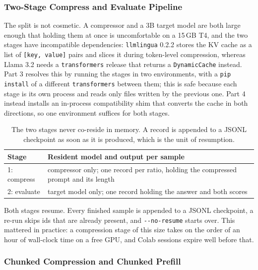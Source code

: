 ﻿\documentclass[10pt,a4paper,twocolumn]{article}
\begin{document}
\subsubsection{Two-Stage Compress and Evaluate Pipeline}
\label{sec:pipeline}

The split is not cosmetic. A compressor and a 3B target model are both large
enough that holding them at once is uncomfortable on a 15\,GB T4, and the two
stages have incompatible dependencies: \texttt{llmlingua} 0.2.2 stores the KV
cache as a list of \texttt{[key, value]} pairs and slices it during token-level
compression, whereas Llama 3.2 needs a \texttt{transformers} release that returns
a \texttt{DynamicCache} instead. Part 3 resolves this by running the stages in two
environments, with a \texttt{pip install} of a different \texttt{transformers}
between them; this is safe because each stage is its own process and reads only
files written by the previous one. Part 4 instead installs an in-process
compatibility shim that converts the cache in both directions, so one environment
suffices for both stages.

\begin{table}[t]
\centering
\footnotesize
\begin{tabularx}{\columnwidth}{@{}lX@{}}
\toprule
Stage & Resident model and output per sample \\
\midrule
1: compress & compressor only; one record per ratio, holding the compressed
prompt and its length \\
2: evaluate & target model only; one record holding the answer and both scores \\
\bottomrule
\end{tabularx}
\caption{The two stages never co-reside in memory. A record is appended to a
JSONL checkpoint as soon as it is produced, which is the unit of resumption.}
\label{tab:stages}
\end{table}

Both stages resume. Every finished sample is appended to a JSONL checkpoint, a
re-run skips ids that are already present, and \texttt{-{}-no-resume} starts over.
This mattered in practice: a compression stage of this size takes on the order
of an hour of wall-clock time on a free GPU, and Colab sessions expire well
before that.

\subsubsection{Chunked Compression and Chunked Prefill}
\label{sec:chunking}
\end{document}
